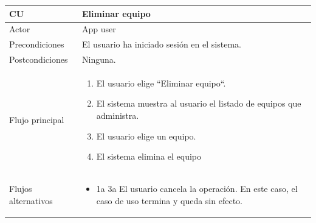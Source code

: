 \documentclass[twoside]{report}
\newcommand\addrow[2]{#1 &#2\\ }
\newcommand\addheading[2]{#1 &#2\\ \hline}
\newcommand\tabularhead{\begin{tabular}{lp{0.7\textwidth}}
\hline
}
\newenvironment{usecase}{\tabularhead}
{\hline\end{tabular}}
\begin{document}
\begin{usecase}
  \addheading{\textbf{CU\arabic{usecase}}}{Eliminar equipo} 
  \addrow{Actor}{App user}
  \addrow{Precondiciones}{El usuario ha iniciado sesión en el sistema.}
  \addrow{Postcondiciones}{Ninguna.}
  \addrow{Flujo principal}{
  		\begin{enumerate}
  		\item El usuario elige “Eliminar equipo“. %
  		\item El sistema muestra al usuario el listado de equipos que administra. %
  		\item El usuario elige un equipo. %
  		\item El sistema elimina el equipo %
  		\end{enumerate}
  }
  \addrow{Flujos alternativos}{
  		\begin{itemize}
  		\item 1a 3a El usuario cancela la operación. En este caso, el caso de uso termina y queda sin efecto.
  		\end{itemize}
  }
\end{usecase}\\
\end{document}
